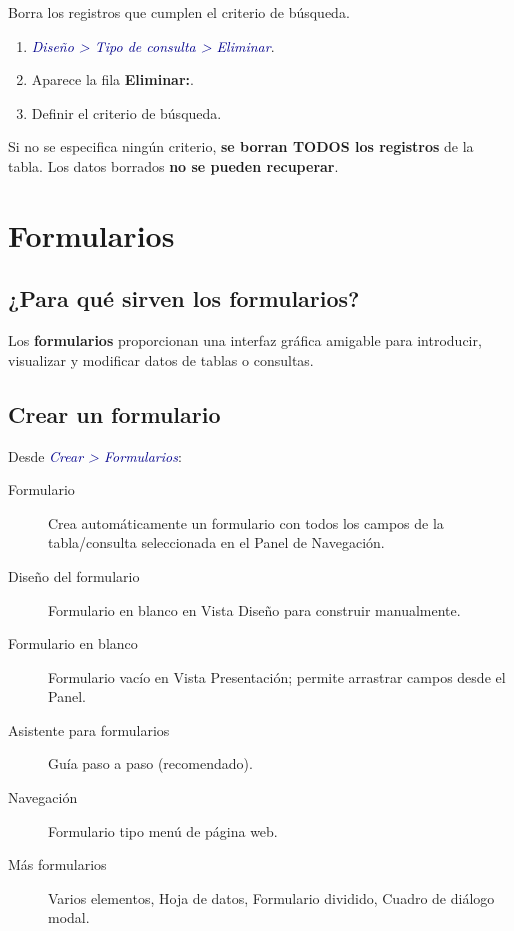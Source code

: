 \documentclass[12pt,a4paper]{article}
\newcommand{\menu}[1]{\textit{\textcolor{darkblue}{#1}}}
\begin{document}
Borra los registros que cumplen el criterio de búsqueda.

\begin{enumerate}
  \item \menu{Diseño > Tipo de consulta > Eliminar}.
  \item Aparece la fila \textbf{Eliminar:}.
  \item Definir el criterio de búsqueda.
\end{enumerate}

\begin{importante}
Si no se especifica ningún criterio, \textbf{se borran TODOS los registros} de la tabla. Los datos borrados \textbf{no se pueden recuperar}.
\end{importante}

\section{Formularios}

\subsection{¿Para qué sirven los formularios?}

Los \textbf{formularios} proporcionan una interfaz gráfica amigable para introducir, visualizar y modificar datos de tablas o consultas.

\subsection{Crear un formulario}

Desde \menu{Crear > Formularios}:

\begin{description}
  \item[Formulario] Crea automáticamente un formulario con todos los campos de la tabla/consulta seleccionada en el Panel de Navegación.
  \item[Diseño del formulario] Formulario en blanco en Vista Diseño para construir manualmente.
  \item[Formulario en blanco] Formulario vacío en Vista Presentación; permite arrastrar campos desde el Panel.
  \item[Asistente para formularios] Guía paso a paso (recomendado).
  \item[Navegación] Formulario tipo menú de página web.
  \item[Más formularios] Varios elementos, Hoja de datos, Formulario dividido, Cuadro de diálogo modal.
\end{description}
\end{document}
